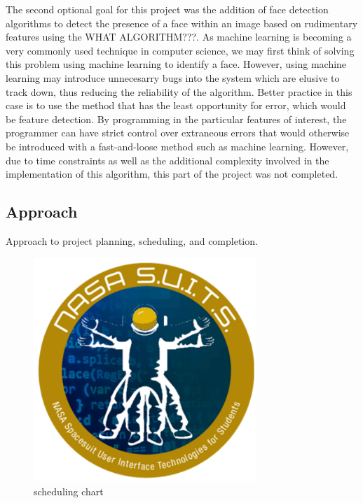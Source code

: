 \documentclass{article}
\let\Oldsubsection\subsection
\renewcommand{\subsection}{\FloatBarrier\Oldsubsection}
\begin{document}
  The second optional goal for this project was the addition of face detection algorithms to detect the presence of a face within an image based on rudimentary features using the WHAT ALGORITHM???. As machine learning is becoming a very commonly used technique in computer science, we may first think of solving this problem using machine learning to identify a face. However, using machine learning may introduce unnecesarry bugs into the system which are elusive to track down, thus reducing the reliability of the algorithm. Better practice in this case is to use the method that has the least opportunity for error, which would be feature detection. By programming in the particular features of interest, the programmer can have strict control over extraneous errors that would otherwise be introduced with a fast-and-loose method such as machine learning. However, due to time constraints as well as the additional complexity involved in the implementation of this algorithm, this part of the project was not completed.


  \subsection{Approach}

  Approach to project planning, scheduling, and completion.

  \begin{figure}[!htb]
    \centering
    \includegraphics[width=0.75\textwidth]{assets/logo.png}
    \caption{scheduling chart}
    \label{fig:spacesuitdisplay}
  \end{figure}
\end{document}
